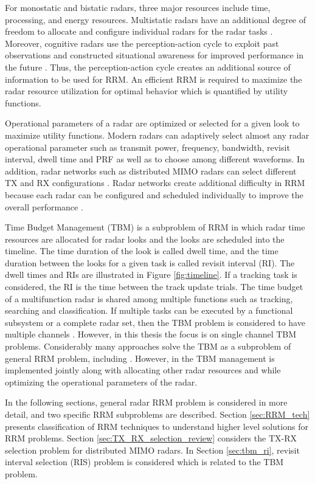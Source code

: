 \documentclass[english, 12pt, a4paper, elec, utf8, a-1b, online]{aaltothesis}
\begin{document}
For monostatic and bistatic radars, three major resources include time, processing, and energy resources. 
Multistatic radars have an additional degree of freedom to allocate and configure individual radars for the radar tasks \cite{Moo2016}. 
Moreover, cognitive radars use the perception-action cycle to exploit past observations and constructed situational awareness for improved performance in the future \cite{Haykin2006}. 
Thus, the perception-action cycle creates an additional source of information to be used for RRM.
An efficient RRM is required to maximize the radar resource utilization for optimal behavior which is quantified by utility functions. 

Operational parameters of a radar are optimized or selected for a given look to maximize utility functions. 
Modern radars can adaptively select almost any radar operational parameter such as transmit power, frequency, bandwidth, revisit interval, dwell time and PRF as well as to choose among different waveforms.
In addition, radar networks such as distributed MIMO radars can select different TX and RX configurations \cite{Godrich2011a, Godrich2011, Sun2014}.
Radar networks create additional difficulty in RRM because each radar can be configured and scheduled individually to improve the overall performance \cite{Sun2014}.

Time Budget Management (TBM) is a subproblem of RRM in which radar time resources are allocated for radar looks and the looks are scheduled into the timeline. 
The time duration of the look is called dwell time, and the time duration between the looks for a given task is called revisit interval (RI). 
The dwell times and RIs are illustrated in Figure \ref{fig:timeline}. 
If a tracking task is considered, the RI is the time between the track update trials. 
The time budget of a multifunction radar is shared among multiple functions such as tracking, searching and classification.
If multiple tasks can be executed by a functional subsystem or a complete radar set, then the TBM problem is considered to have multiple channels \cite{Shaghaghi2018}.
However, in this thesis the focus is on single channel TBM problems.
Considerably many approaches solve the TBM as a subproblem of general RRM problem, including \cite{Koch1999, Wintenby2006, Byrne2016, Xu2010}. 
However, in \cite{Rajkumar1997, Irci2010, Charlish2015a} the TBM management is implemented jointly along with allocating other radar resources and while optimizing the operational parameters of the radar.


In the following sections, general radar RRM problem is considered in more detail, and two specific RRM subproblems are described.
Section \ref{sec:RRM_tech} presents classification of RRM techniques to understand higher level solutions for RRM problems.
Section \ref{sec:TX_RX_selection_review} considers the TX-RX selection problem for distributed MIMO radars. 
In Section \ref{sec:tbm_ri}, revisit interval selection (RIS) problem is considered which is related to the TBM problem.
\end{document}
